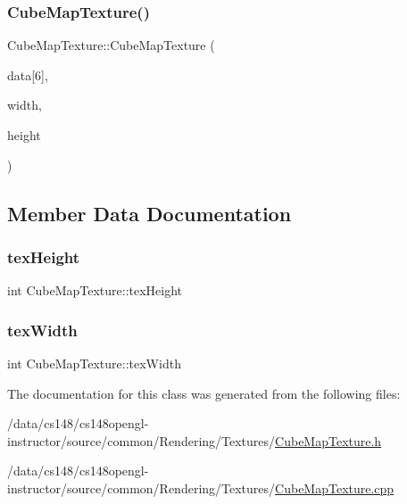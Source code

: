 \subsubsection{\texorpdfstring{Cube\+Map\+Texture()}{CubeMapTexture()}}
{\footnotesize\ttfamily Cube\+Map\+Texture\+::\+Cube\+Map\+Texture (\begin{DoxyParamCaption}\item[{G\+Lubyte $\ast$}]{data\mbox{[}6\mbox{]},  }\item[{int}]{width,  }\item[{int}]{height }\end{DoxyParamCaption})}



\subsection{Member Data Documentation}
\hypertarget{class_cube_map_texture_ad7cb6fe0f1405749dac36016772b4de9}{}\label{class_cube_map_texture_ad7cb6fe0f1405749dac36016772b4de9} 
\subsubsection{\texorpdfstring{tex\+Height}{texHeight}}
{\footnotesize\ttfamily int Cube\+Map\+Texture\+::tex\+Height\hspace{0.3cm}{\ttfamily [private]}}

\hypertarget{class_cube_map_texture_a7890234be6ca631a5f17a9ab9d7e597c}{}\label{class_cube_map_texture_a7890234be6ca631a5f17a9ab9d7e597c} 
\subsubsection{\texorpdfstring{tex\+Width}{texWidth}}
{\footnotesize\ttfamily int Cube\+Map\+Texture\+::tex\+Width\hspace{0.3cm}{\ttfamily [private]}}



The documentation for this class was generated from the following files\+:\begin{DoxyCompactItemize}
\item 
/data/cs148/cs148opengl-\/instructor/source/common/\+Rendering/\+Textures/\hyperlink{_cube_map_texture_8h}{Cube\+Map\+Texture.\+h}\item 
/data/cs148/cs148opengl-\/instructor/source/common/\+Rendering/\+Textures/\hyperlink{_cube_map_texture_8cpp}{Cube\+Map\+Texture.\+cpp}\end{DoxyCompactItemize}
